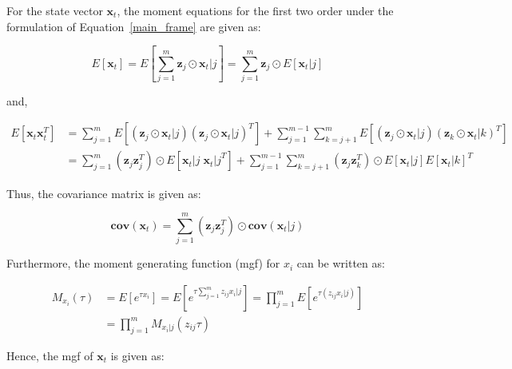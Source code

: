 For the state vector $\textbf{x}_t$, the moment equations for the first two order under the formulation of Equation~\ref{main_frame} are given as:

\begin{equation}
\label{mean}
E \left[\textbf{x}_t \right] = E \left[ \sum_{j=1}^m \textbf{z}_j \odot \textbf{x}_t|j  \right] =\sum_{j=1}^m  \textbf{z}_j \odot E \left[  \textbf{x}_t|j  \right]  
\end{equation}

and,

\begin{equation}
\begin{array}{ll}
E \left[\textbf{x}_t \textbf{x}^T_t  \right] &= \displaystyle  \sum_{j=1}^m E \left[\left( \textbf{z}_j \odot \textbf{x}_t|j\right) \left( \textbf{z}_j \odot \textbf{x}_t|j\right)^T \right] + \sum_{j=1}^{m-1} \sum_{k=j+1}^m E \left[\left( \textbf{z}_j \odot \textbf{x}_t|j\right) \left( \textbf{z}_k \odot \textbf{x}_t|k\right)^T \right] \\
&= \displaystyle \sum_{j=1}^m \left( \textbf{z}_j \textbf{z}^T_j  \right) \odot E \left[ {\textbf{x}_t|j} \; {\textbf{x}_t|j}^T \right] + \sum_{j=1}^{m-1} \sum_{k=j+1}^m \left( \textbf{z}_j \textbf{z}^T_k  \right) \odot E \left[ {\textbf{x}_t|j}\right] E \left[{\textbf{x}_t|k} \right]^T
\end{array}
\end{equation}

Thus, the covariance matrix is given as:

\begin{equation}
\label{covariance}
\mathbf{cov}(\textbf{x}_t) = \sum_{j=1}^m \left(\textbf{z}_j \textbf{z}^T_j \right) \odot \mathbf{cov} \left( \textbf{x}_t|j \right)
\end{equation}

Furthermore, the moment generating function (mgf) for $x_i$ can be written as:

\begin{equation}
\begin{array}{ll}
M_{x_i}(\tau) &=  E \left[ e^{\tau x_i} \right] = E \left[ e^{\tau \sum_{j=1}^m  z_{ij} x_{i}|j} \right] = \displaystyle \prod_{j=1}^m E \left[e^{\tau (z_{ij} x_{i}|j )}  \right] \\
&= \displaystyle \prod_{j=1}^m M_{x_{i}|j} (z_{ij} \tau)
\end{array}
\end{equation}

Hence, the mgf of $\textbf{x}_t$ is given as:


